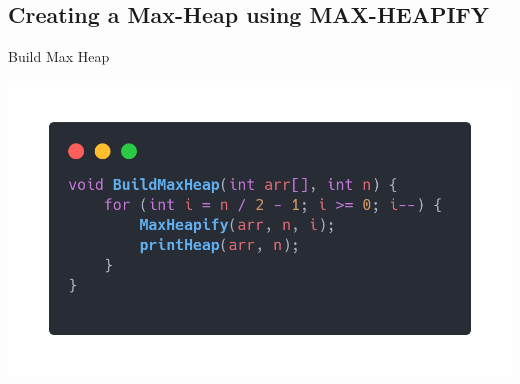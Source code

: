 \documentclass[12pt,openany]{book}
\theoremstyle{definition}
\begin{document}
	\subsection{Creating a Max-Heap using MAX-HEAPIFY}
	\begin{algorithm}[H]
		\caption{Build Max Heap}
		\DontPrintSemicolon
		\SetAlgoLined
		\BlankLine
	\end{algorithm}
	\begin{center}
		\begin{minipage}{.65\textwidth}
			\includegraphics[width=\textwidth]{BuildMaxHeap.png}
		\end{minipage}
		\begin{minipage}{.325\textwidth}

\end{minipage}
\end{center}
\end{document}
